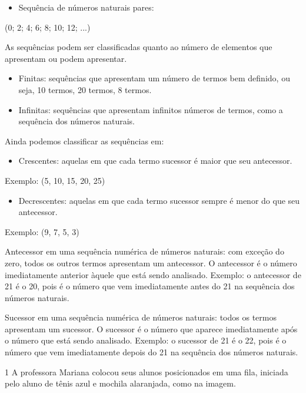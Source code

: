 \begin{escolha}
\begin{itemize}
\item
  Sequência de números naturais pares:
\end{itemize}

(0; 2; 4; 6; 8; 10; 12; ...)

As sequências podem ser classificadas quanto ao número de elementos que apresentam ou podem apresentar.

\begin{itemize}
\item
  Finitas: sequências que apresentam um número de termos bem definido,
  ou seja, 10 termos, 20 termos, 8 termos.
\item
  Infinitas: sequências que apresentam infinitos números de termos, como a sequência dos números naturais.
\end{itemize}

Ainda podemos classificar as sequências em:

\begin{itemize}
\item
  Crescentes: aquelas em que cada termo sucessor é maior que seu antecessor.
\end{itemize}

Exemplo: (5, 10, 15, 20, 25)

\begin{itemize}
\item
  Decrescentes: aquelas em que cada termo sucessor sempre é menor do que seu antecessor.
\end{itemize}

Exemplo: (9, 7, 5, 3)

Antecessor em uma sequência numérica de números naturais: com exceção do zero,
todos os outros termos apresentam um antecessor. O antecessor é o número
imediatamente anterior àquele que está sendo analisado. Exemplo: o
antecessor de 21 é o 20, pois é o número que vem imediatamente antes do 21 na sequência dos números naturais.

Sucessor em uma sequência numérica de números naturais: todos os termos
apresentam um sucessor. O sucessor é o número que aparece imediatamente após o número que está sendo analisado. Exemplo: o sucessor de 21 é o 22, pois é o
número que vem imediatamente depois do 21 na sequência dos números naturais.


\num{1} A professora Mariana colocou seus alunos posicionados em uma fila, iniciada pelo aluno de tênis azul e mochila alaranjada, como na imagem.


\end{escolha}
